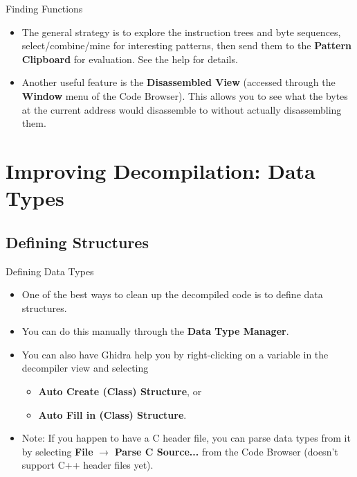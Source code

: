 \documentclass{beamer}
\begin{document}
\begin{frame}
\begin{block}{Finding Functions}
\begin{itemize}
\item The general strategy is to explore the instruction trees and byte sequences, select/combine/mine for interesting patterns, then send them to the \textbf{Pattern Clipboard} for
evaluation.  See the help for details.
\item Another useful feature is the \textbf{Disassembled View} (accessed through the \textbf{Window} menu of the Code Browser).  This allows you to see what the bytes at the current
address would disassemble to without actually disassembling them.
\end{itemize}
\end{block}
\end{frame}


\section{Improving Decompilation: Data Types}

\subsection{Defining Structures}

\begin{frame}
\begin{block}{Defining Data Types}
\begin{itemize}
\item One of the best ways to clean up the decompiled code is to define data structures.
\item You can do this manually through the \textbf{Data Type Manager}.
\item You can also have Ghidra help you by right-clicking on a variable in the decompiler view and selecting
\begin{itemize}
\item \textbf{Auto Create (Class) Structure}, or
\item \textbf{Auto Fill in (Class) Structure}.
\end{itemize}
\item Note: If you happen to have a C header file, you can parse data types from it by selecting \textbf{File} $\rightarrow$ \textbf{Parse C Source...} from the Code Browser
(doesn't support C++ header files yet).
\end{itemize}
\end{block}
\end{frame}
\end{document}
